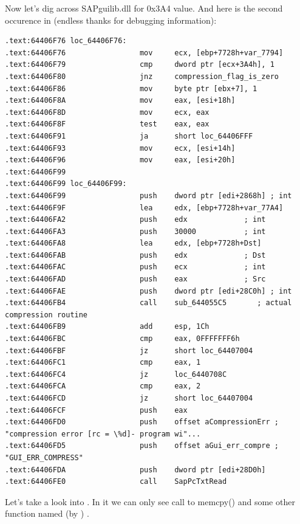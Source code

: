 {Now let's dig across SAPguilib.dll for 0x3A4 value. And here is the second occurence in 
 (endless thanks for debugging information):}

\begin{lstlisting}
.text:64406F76 loc_64406F76:
.text:64406F76                 mov     ecx, [ebp+7728h+var_7794]
.text:64406F79                 cmp     dword ptr [ecx+3A4h], 1
.text:64406F80                 jnz     compression_flag_is_zero
.text:64406F86                 mov     byte ptr [ebx+7], 1
.text:64406F8A                 mov     eax, [esi+18h]
.text:64406F8D                 mov     ecx, eax
.text:64406F8F                 test    eax, eax
.text:64406F91                 ja      short loc_64406FFF
.text:64406F93                 mov     ecx, [esi+14h]
.text:64406F96                 mov     eax, [esi+20h]
.text:64406F99
.text:64406F99 loc_64406F99:
.text:64406F99                 push    dword ptr [edi+2868h] ; int
.text:64406F9F                 lea     edx, [ebp+7728h+var_77A4]
.text:64406FA2                 push    edx             ; int
.text:64406FA3                 push    30000           ; int
.text:64406FA8                 lea     edx, [ebp+7728h+Dst]
.text:64406FAB                 push    edx             ; Dst
.text:64406FAC                 push    ecx             ; int
.text:64406FAD                 push    eax             ; Src
.text:64406FAE                 push    dword ptr [edi+28C0h] ; int
.text:64406FB4                 call    sub_644055C5       ; actual compression routine
.text:64406FB9                 add     esp, 1Ch
.text:64406FBC                 cmp     eax, 0FFFFFFF6h
.text:64406FBF                 jz      short loc_64407004
.text:64406FC1                 cmp     eax, 1
.text:64406FC4                 jz      loc_6440708C
.text:64406FCA                 cmp     eax, 2
.text:64406FCD                 jz      short loc_64407004
.text:64406FCF                 push    eax
.text:64406FD0                 push    offset aCompressionErr ; "compression error [rc = \%d]- program wi"...
.text:64406FD5                 push    offset aGui_err_compre ; "GUI_ERR_COMPRESS"
.text:64406FDA                 push    dword ptr [edi+28D0h]
.text:64406FE0                 call    SapPcTxtRead
\end{lstlisting}

{Let's take a look into . In it we can only see call to memcpy() and some other function named 
(by \IDA) .}

